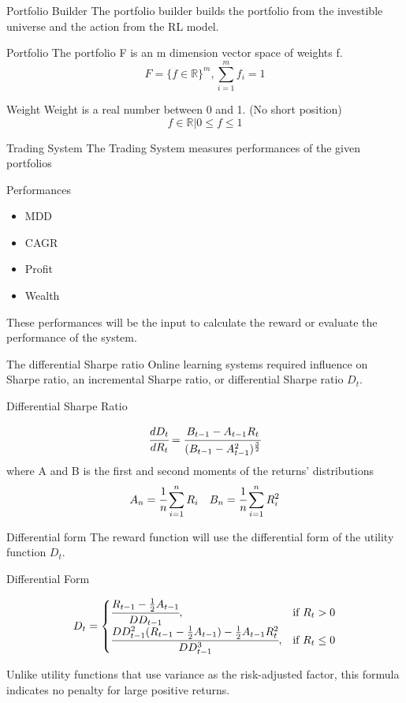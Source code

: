 \begin{frame}{Portfolio Builder}
The portfolio builder builds the portfolio from the investible universe and the action from the RL model.
\\
\begin{block}{Portfolio}
The portfolio F is an m dimension vector space of weights f.
\[
    F = \{ {f \in \mathbb{R} } \} ^m,
    \sum_{i=1}^m {f_i} =1
\]
\end{block}
\begin{block}{Weight}
Weight is a real number between 0 and 1. \alert{(No short position)}
\[
    f \in \mathbb{R} | 0 \leq f \leq 1 
\]
\end{block}
\end{frame}




\begin{frame}{Trading System}
The Trading System measures performances of the given portfolios
\begin{block}{Performances}
\begin{itemize}
    \item MDD
    \item CAGR
    \item Profit
    \item Wealth
\end{itemize}
\end{block}
These performances will be the input to calculate the reward or evaluate the performance of the system. 
\end{frame}


\begin{frame}{The differential Sharpe ratio}
Online learning systems required influence on Sharpe ratio, an incremental Sharpe ratio, or differential Sharpe ratio \(D_t\).
\begin{block}{Differential Sharpe Ratio}

\[
\cfrac{d D_t}{d R_t} = 
\cfrac{B_{t-1}-A_{t-1} R_t}{(B_{t-1}-A_{t-1}^2)^\frac{3}{2}}
\]
where
A and B is the first and second moments of the returns' distributions
\[ A_n = \cfrac{1}{n}\sum_{i=1}^nR_i\quad
B_n = \cfrac{1}{n}\sum_{i=1}^nR_i^2
\]
\end{block}
\end{frame}


\begin{frame}{Differential form}
The reward function will use the differential form of the utility function \(D_t\).

\begin{block}{Differential Form}

\[
D_t = 
\begin{cases}
    \cfrac{R_{t-1} -\frac{1}{2}A_{t-1}}{DD_{t-1}},&\text{if  }R_t > 0\\
    \cfrac{DD_{t-1}^2 (R_{t-1}-\frac{1}{2}A_{t-1})  -\frac{1}{2}A_{t-1} R_t^2}{DD_{t-1}^3},&\text{if  }R_t \leq 0
\end{cases}
\]
\end{block}
Unlike utility functions that use variance as the risk-adjusted factor, this formula indicates no penalty for large positive returns. 

\end{frame}



